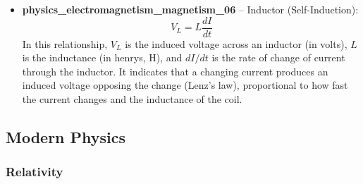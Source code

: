 \documentclass[11pt,a4paper]{article}
\begin{document}
\begin{itemize}
\item \textbf{physics\_electromagnetism\_magnetism\_06} -- Inductor (Self-Induction): 
\[V_L = L\frac{dI}{dt}\]
In this relationship, $V_L$ is the induced voltage across an inductor (in volts), $L$ is the inductance (in henrys, H), and $dI/dt$ is the rate of change of current through the inductor. It indicates that a changing current produces an induced voltage opposing the change (Lenz's law), proportional to how fast the current changes and the inductance of the coil.
\end{itemize}

\subsection{Modern Physics}

\subsubsection{Relativity}
\end{document}
